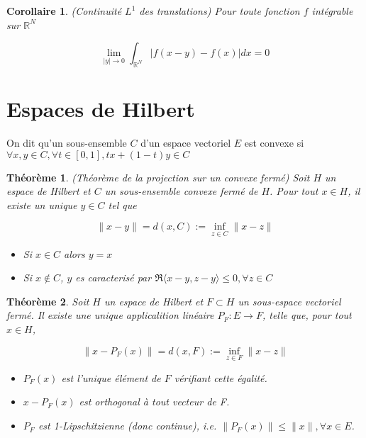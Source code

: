 \documentclass[10pt,a4paper,oneside]{article}
\newtheorem{theoreme}{Théorème}
\newtheorem{corollaire}{Corollaire}
\newenvironment{definition}[1][Definition]{\begin{trivlist}
\item[\hskip \labelsep {\bfseries #1}]}{\end{trivlist}}
\begin{document}
\begin{corollaire}
(Continuité $L^1$ des translations)
Pour toute fonction $f$ intégrable sur $\mathbb{R}^N$

\[ \lim_{|y| \to 0} \int_{\mathbb{R}^N} |f(x - y) - f(x)| dx = 0 \]
\end{corollaire}

\section{Espaces de Hilbert}

\begin{definition}
On dit qu'un sous-ensemble $C$ d'un espace vectoriel $E$ est convexe si
$\forall x,y \in C, \forall t \in [0,1], tx + (1 - t)y \in C$
\end{definition}

\begin{theoreme}
(Théorème de la projection sur un convexe fermé) Soit $H$ un espace de Hilbert et $C$ un sous-ensemble convexe fermé de $H$. Pour tout $x \in H$, il existe un unique $y \in C$ tel que

\[
\| x - y \| = d(x,C) := \inf_{z \in C} \| x - z \|
\]

\begin{itemize}

\item
Si $x \in C$ alors $y = x$

\item
Si $x \not\in C$, $y$ es caracterisé par $\Re \langle x - y,z - y \rangle \leq 0, \forall z \in C$

\end{itemize}

\end{theoreme}


\begin{theoreme}
Soit $H$ un espace de Hilbert et $F \subset H$ un sous-espace vectoriel fermé. Il existe une unique applicalition linéaire $P_F: E \to F$, telle que, pour tout $x \in H$,

\[ \| x - P_F(x) \| = d(x,F) := \inf_{z \in F} \| x - z \| \]

\begin{itemize}
\item
$P_F(x)$ est l'unique élément de $F$ vérifiant cette égalité.

\item
$x - P_F(x)$ est orthogonal à tout vecteur de F.

\item
$P_F$ est 1-Lipschitzienne (donc continue), i.e. $\| P_F(x) \| \leq \| x \|, \forall x \in E$.

\end{itemize}

\end{theoreme}
\end{document}
